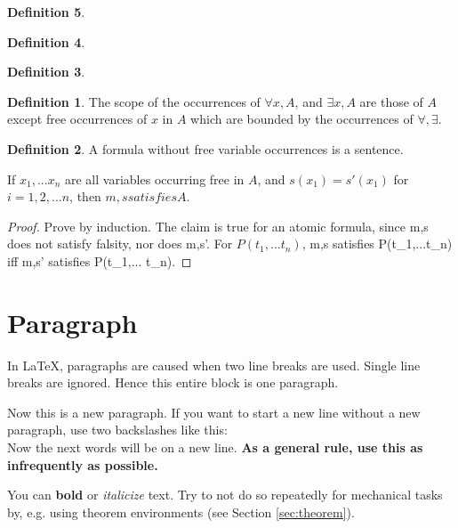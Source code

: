 \documentclass[11pt]{article}
\theoremstyle{plain} %
\theoremstyle{definition}
\newtheorem*{definition}{Definition} %
\theoremstyle{example}
\theoremstyle{remark}
\begin{document}
\begin{definition}
\begin{definition}
\begin{definition}
\begin{definition}
The scope of the occurrences of $\forall x, A$, and $\exists x, A$ are those of $A$ except free occurrences of $x$ in $A$ which are bounded by the occurrences of $\forall, \exists$.
\end{definition}

\begin{definition}
A formula without free variable occurrences is a sentence. 
\end{definition}

If $x_1, ...x_n$ are all variables occurring free in $A$, and $s(x_1) = s'(x_1)$ for $i = 1, 2, ...n$, then $m,s satisfies A$.

\begin{proof}
Prove by induction. The claim is true for an atomic formula, since m,s does not satisfy falsity, nor does m,s'. For $P(t_1, ...t_n)$, m,s satisfies P(t_1,...t_n) iff m,s' satisfies P(t_1,... t_n).
\end{proof}




































\section{Paragraph}
In \LaTeX, paragraphs are caused
when two line breaks are used.
Single line breaks are ignored.
Hence this entire block is one paragraph.

Now this is a new paragraph. If you want to
start a new line without a new paragraph, use
two backslashes like this:
\\
Now the next words will be on a new line.
\textbf{As a general rule, use this as infrequently as possible.}

You can \textbf{bold} or \textit{italicize} text.
Try to not do so repeatedly for mechanical tasks by, e.g. using theorem environments (see Section \ref{sec:theorem}).



\end{definition}
\end{definition}
\end{definition}
\end{document}
